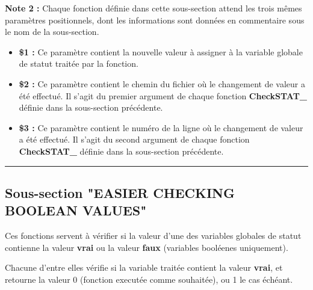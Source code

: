 \documentclass[a4paper,10pt]{article}
\begin{document}
\begin{justify}
    \textbf{Note 2 :} Chaque fonction définie dans cette sous-section attend les trois mêmes paramètres positionnels, dont les informations sont données en commentaire sous le nom de la sous-section.

    \begin{itemize}
        \item \textbf{\$1 :} Ce paramètre contient la nouvelle valeur à assigner à la variable globale de statut traitée par la fonction.\\

        \item \textbf{\$2 :} Ce paramètre contient le chemin du fichier où le changement de valeur a été effectué. Il s'agit du premier argument de chaque fonction \textbf{\color{mauve}CheckSTAT\_} définie dans la sous-section précédente.\\

        \item \textbf{\$3 :} Ce paramètre contient le numéro de la ligne où le changement de valeur a été effectué. Il s'agit du second argument de chaque fonction \textbf{\color{mauve}CheckSTAT\_} définie dans la sous-section précédente.
    \end{itemize}
\end{justify}




\color{green}\par\noindent\rule{\textwidth}{0.4pt}\color{white}

\color{green}
\subsection{Sous-section "EASIER CHECKING BOOLEAN VALUES"}\color{white}

\begin{justify}
    Ces fonctions servent à vérifier si la valeur d'une des variables globales de statut contienne la valeur \textbf{vrai} ou la valeur \textbf{faux} (variables booléenes uniquement).
\end{justify}

\begin{justify}
    Chacune d'entre elles vérifie si la variable traitée contient la valeur \textbf{vrai}, et retourne la valeur 0 (fonction executée comme souhaitée), ou 1 le cas échéant.
\end{justify}
\end{document}
